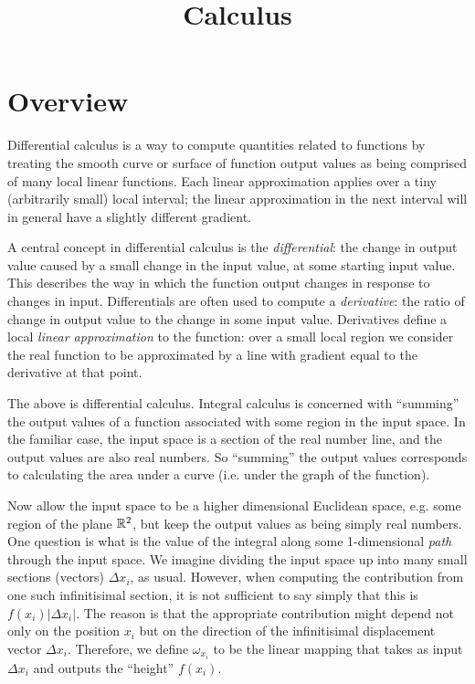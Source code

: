 \documentclass[12pt]{article}
\begin{document}
\title{Calculus}
\maketitle
\tableofcontents

\section{Overview}
Differential calculus is a way to compute quantities related to functions by
treating the smooth curve or surface of function output values as being
comprised of many local linear functions. Each linear approximation applies
over a tiny (arbitrarily small) local interval; the linear approximation in the
next interval will in general have a slightly different gradient.

A central concept in differential calculus is the \textit{differential}: the
change in output value caused by a small change in the input value, at some
starting input value. This describes the way in which the function output
changes in response to changes in input. Differentials are often used to
compute a \textit{derivative}: the ratio of change in output value to the
change in some input value. Derivatives define a local \textit{linear
  approximation} to the function: over a small local region we consider the
real function to be approximated by a line with gradient equal to the
derivative at that point.

The above is differential calculus. Integral calculus is concerned with
``summing'' the output values of a function associated with some region in the
input space. In the familiar case, the input space is a section of the real
number line, and the output values are also real numbers. So ``summing'' the
output values corresponds to calculating the area under a curve (i.e. under the
graph of the function).

Now allow the input space to be a higher dimensional Euclidean space, e.g. some
region of the plane $\mathbb{R}^2$, but keep the output values as being simply real
numbers. One question is what is the value of the integral along some
1-dimensional \textit{path} through the input space. We imagine dividing the
input space up into many small sections (vectors) $\Delta x_i$, as
usual. However, when computing the contribution from one such infinitisimal
section, it is not sufficient to say simply that this is $f(x_i)|\Delta
x_i|$. The reason is that the appropriate contribution might depend not only on
the position $x_i$ but on the direction of the infinitisimal displacement
vector $\Delta x_i$. Therefore, we define $\omega_{x_i}$ to be the linear
mapping that takes as input $\Delta x_i$ and outputs the ``height'' $f(x_i)$.
\end{document}
